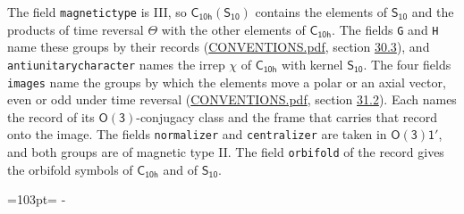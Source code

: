 \documentclass[10pt,a4paper]{article}
\newcommand{\needspace}[1]{\par\penalty-100\begingroup\dimen0=#1\relax\dimen2=\pagegoal
  \advance\dimen2-\pagetotal\ifdim\dimen0>\dimen2\relax\ifdim\dimen2>0pt\vfil\break\fi\fi
  \endgroup}
\numberwithin{equation}{section}
\newcommand{\grp}[1]{\mathsf{#1}}
\begin{document}
The field \texttt{magnetictype} is III, so $\grp{C_{10h}}(\grp{S_{10}})$ contains the elements of $\grp{S_{10}}$ and the products of time reversal $\varTheta$ with the other elements of $\grp{C_{10h}}$. The fields \texttt{G} and \texttt{H} name these groups by their records (\href{../../CONVENTIONS.pdf}{CONVENTIONS.pdf}, section \href{../../CONVENTIONS.pdf\#conv.30.3}{30.3}), and \texttt{antiunitarycharacter} names the irrep $\chi$ of $\grp{C_{10h}}$ with kernel $\grp{S_{10}}$. The four fields \texttt{images} name the groups by which the elements move a polar or an axial vector, even or odd under time reversal (\href{../../CONVENTIONS.pdf}{CONVENTIONS.pdf}, section \href{../../CONVENTIONS.pdf\#conv.31.2}{31.2}). Each names the record of its $\grp{O(3)}$-conjugacy class and the frame that carries that record onto the image. The fields \texttt{normalizer} and \texttt{centralizer} are taken in $\grp{O(3)1'}$, and both groups are of magnetic type II. The field \texttt{orbifold} of the record gives the orbifold symbols of $\grp{C_{10h}}$ and of $\grp{S_{10}}$.
\needspace{103pt}
\end{document}
